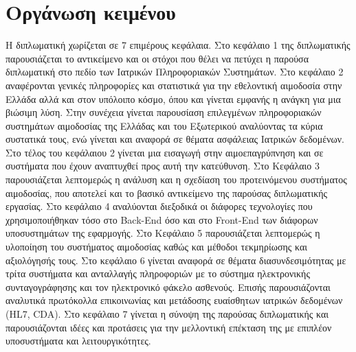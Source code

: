 \section{Οργάνωση κειμένου}
H διπλωματική χωρίζεται σε 7 επιμέρους κεφάλαια. Στο κεφάλαιο 1 της διπλωματικής παρουσιάζεται το αντικείμενο και οι στόχοι που θέλει να πετύχει η παρούσα διπλωματική στο πεδίο των Ιατρικών Πληροφοριακών Συστημάτων. Στο κεφάλαιο 2 αναφέρονται γενικές πληροφορίες και στατιστικά για την εθελοντική αιμοδοσία στην Ελλάδα αλλά και στον υπόλοιπο κόσμο, όπου και γίνεται εμφανής η ανάγκη για μια βιώσιμη λύση. Στην συνέχεια γίνεται παρουσίαση επιλεγμένων πληροφοριακών συστημάτων αιμοδοσίας της Ελλάδας και του Εξωτερικού αναλύοντας τα κύρια συστατικά τους, ενώ γίνεται και αναφορά σε θέματα ασφάλειας Ιατρικών δεδομένων. Στο τέλος του κεφάλαιου 2 γίνεται μια εισαγωγή στην αιμοεπαγρύπνηση και σε συστήματα που έχουν αναπτυχθεί προς αυτή την κατεύθυνση. Στο Κεφάλαιο 3 παρουσιάζεται λεπτομερώς η ανάλυση και η σχεδίαση του προτεινόμενου συστήματος αιμοδοσίας, που αποτελεί και το βασικό αντικείμενο της παρούσας διπλωματικής εργασίας. Στο κεφάλαιο 4 αναλύονται διεξοδικά οι διάφορες τεχνολογίες που χρησιμοποιήθηκαν τόσο στο Back-End όσο και στο Front-End των διάφορων υποσυστημάτων της εφαρμογής. Στο Κεφάλαιο 5 παρουσιάζεται λεπτομερώς η υλοποίηση του συστήματος αιμοδοσίας καθώς και μέθοδοι τεκμηρίωσης και αξιολόγησής τους. Στο κεφάλαιο 6 γίνεται αναφορά σε θέματα διασυνδεσιμότητας με τρίτα συστήματα και ανταλλαγής πληροφοριών με το σύστημα ηλεκτρονικής συνταγογράφησης και τον ηλεκτρονικό φάκελο ασθενούς. Επισής παρουσιάζονται αναλυτικά πρωτόκολλα επικοινωνίας και μετάδοσης ευαίσθητων ιατρικών δεδομένων (HL7, CDA). Στο κεφάλαιο 7 γίνεται η σύνοψη της παρούσας διπλωματικής και παρουσιάζονται ιδέες και προτάσεις για την μελλοντική επέκταση της με επιπλέον υποσυστήματα και λειτουργικότητες.